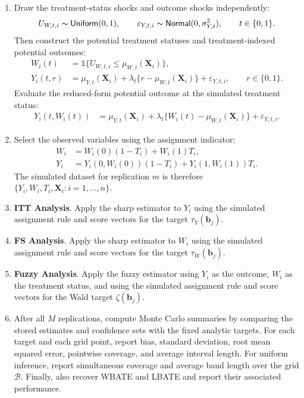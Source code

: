 \documentclass[10pt]{article}
\newcommand{\Indicator}{\mathds{1}}
\newcommand{\bb}{\mathbf{b}}
\newcommand{\bX}{\mathbf{X}}
\newcommand{\B}{\mathcal{B}}
\begin{document}
\begin{enumerate}[label=\normalfont Step \arabic*.,leftmargin=*]
    \item Draw the treatment-status shocks and outcome shocks independently:
    \[
        U_{W,t,i}\thicksim\mathsf{Uniform}(0,1),
        \qquad
        \varepsilon_{Y,t,i}\thicksim\mathsf{Normal}(0,\sigma_{Y,t}^2),
        \qquad t\in\{0,1\}.
    \]
    Then construct the potential treatment statuses and treatment-indexed potential outcomes:
    \begin{align*}
        W_i(t)
        &=
        \Indicator\{U_{W,t,i}\leq \mu_{W,t}(\bX_i)\},\\
        Y_i(t,r)
        &=
        \mu_{Y,t}(\bX_i)
        +\lambda_t\{r-\mu_{W,t}(\bX_i)\}
        +\varepsilon_{Y,t,i},
        \qquad r\in\{0,1\}.
    \end{align*}
    Evaluate the reduced-form potential outcome at the simulated treatment status:
    \begin{align*}
        Y_i(t,W_i(t))
        &=
        \mu_{Y,t}(\bX_i)
        +\lambda_t\{W_i(t)-\mu_{W,t}(\bX_i)\}
        +\varepsilon_{Y,t,i}.
    \end{align*}

    \item Select the observed variables using the assignment indicator:
    \begin{align*}
        W_i
        &=
        W_i(0)(1-T_i)+W_i(1)T_i,\\
        Y_i
        &=
        Y_i(0,W_i(0))(1-T_i)+Y_i(1,W_i(1))T_i.
    \end{align*}
    The simulated dataset for replication $m$ is therefore $\{Y_i,W_i,T_i,\bX_i:i=1,\ldots,n\}$.

    \item \textbf{ITT Analysis}. Apply the sharp estimator to $Y_i$ using the simulated assignment rule and score vectors for the target $\tau_Y(\bb_j)$.

    \item \textbf{FS Analysis}. Apply the sharp estimator to $W_i$ using the simulated assignment rule and score vectors for the target $\tau_W(\bb_j)$.

    \item \textbf{Fuzzy Analysis}. Apply the fuzzy estimator using $Y_i$ as the outcome, $W_i$ as the treatment status, and using the simulated assignment rule and score vectors for the Wald target $\zeta(\bb_j)$.

    \item After all $M$ replications, compute Monte Carlo summaries by comparing the stored estimates and confidence sets with the fixed analytic targets. For each target and each grid point, report bias, standard deviation, root mean squared error, pointwise coverage, and average interval length. For uniform inference, report simultaneous coverage and average band length over the grid $\B$.
    Finally, also recover WBATE and LBATE and report their associated performance.
\end{enumerate}
\end{document}
